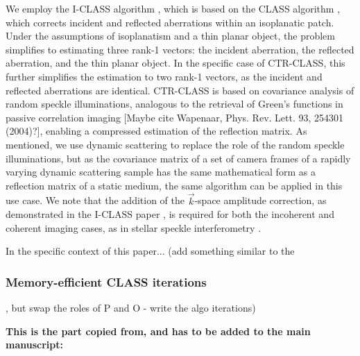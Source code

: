 \documentclass[12pt]{article}
\newenvironment{ourresponse}
    {\begin{tcolorbox}[width=\linewidth,breakable,enhanced,colback=gray!5,colframe=responsecolor!50,title=Response,left=5pt,right=5pt]}
    {\end{tcolorbox}}
\begin{document}
\begin{enumerate}[label=\arabic*.]
\begin{ourresponse}
        We employ the I-CLASS algorithm \cite{ weinberg2023noninvasive}, which is based on the CLASS algorithm \cite{kang17, kang2024implementation}, which corrects incident and reflected aberrations within an isoplanatic patch. Under the assumptions of isoplanatism and a thin planar object, the problem simplifies to estimating three rank-1 vectors: the incident aberration, the reflected aberration, and the thin planar object. In the specific case of CTR-CLASS, this further simplifies the estimation to two rank-1 vectors, as the incident and reflected aberrations are identical. CTR-CLASS is based on covariance analysis of random speckle illuminations, analogous to the retrieval of Green’s functions in passive correlation imaging [Maybe cite Wapenaar, Phys. Rev. Lett. 93, 254301 (2004)?], enabling a compressed estimation of the reflection matrix. As mentioned, we use dynamic scattering to replace the role of the random speckle illuminations, but as the covariance matrix of a set of camera frames of a rapidly varying dynamic scattering sample has the same mathematical form as a reflection matrix of a static medium, the same algorithm can be applied in this use case. We note that the addition of the $\vec{k}$-space amplitude correction, as demonstrated in the I-CLASS paper \cite{weinberg2023noninvasive}, is required for both the incoherent and coherent imaging cases, as in stellar speckle interferometry \cite{labeyrie1970attainment}.
        
        In the specific context of this paper... (add something similar to the \subsubsection*{Memory-efficient CLASS iterations}, but swap the roles of P and O - write the algo iterations)


        
        \textbf{This is the part copied from, and has to be added to the main manuscript:}
        \begin{quote}

\end{quote}
\end{ourresponse}
\end{enumerate}
\end{document}
